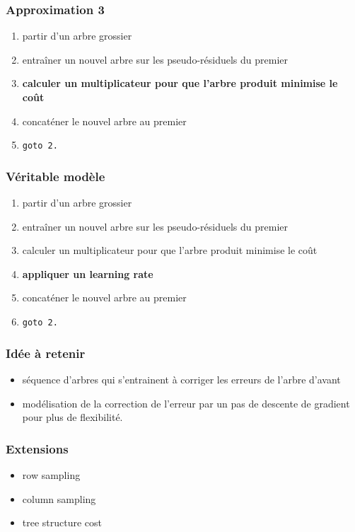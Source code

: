 \begin{frame}
  \frametitle{Approximation 3}
  \begin{enumerate}
  \item partir d'un arbre grossier
  \item entraîner un nouvel arbre sur les pseudo-résiduels du premier
  \item \textbf{calculer un multiplicateur pour que l'arbre produit
      minimise le coût}
  \item concaténer le nouvel arbre au premier
  \item \texttt{goto 2.}
  \end{enumerate}
\end{frame}

\begin{frame}
  \frametitle{Véritable modèle}
  \begin{enumerate}
  \item partir d'un arbre grossier
  \item entraîner un nouvel arbre sur les pseudo-résiduels du premier
  \item calculer un multiplicateur pour que l'arbre produit minimise
    le coût
  \item \textbf{appliquer un learning rate}
  \item concaténer le nouvel arbre au premier
  \item \texttt{goto 2.}
  \end{enumerate}
\end{frame}

\begin{frame}
  \frametitle{Idée à retenir}

  \begin{itemize}
  \item séquence d'arbres qui s'entrainent à corriger les erreurs de
    l'arbre d'avant
  \item modélisation de la correction de l'erreur par un pas de
    descente de gradient pour plus de flexibilité.
  \end{itemize}
   
\end{frame}

\begin{frame}
  \frametitle{Extensions}

  \begin{itemize}
  \item row sampling
  \item column sampling
  \item tree structure cost
  \end{itemize}
\end{frame}

